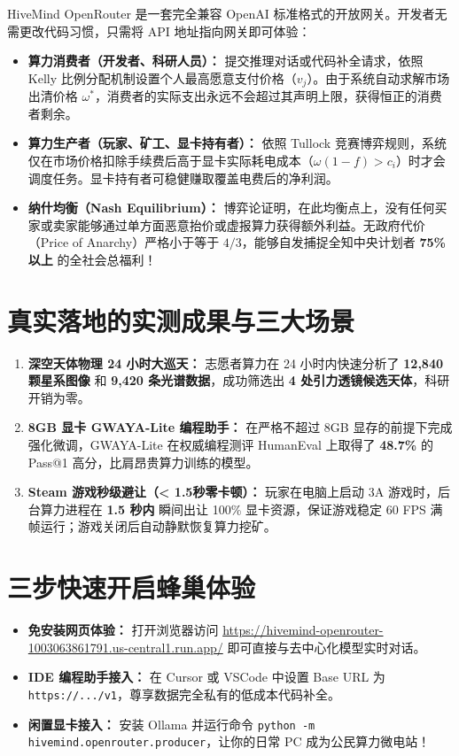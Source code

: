 \documentclass[11pt,a4paper]{report}
\begin{document}
HiveMind OpenRouter 是一套完全兼容 OpenAI 标准格式的开放网关。开发者无需更改代码习惯，只需将 API 地址指向网关即可体验：

\begin{itemize}[leftmargin=1.8em]
    \item \textbf{算力消费者（开发者、科研人员）：} 提交推理对话或代码补全请求，依照 Kelly 比例分配机制设置个人最高愿意支付价格（$v_j$）。由于系统自动求解市场出清价格 $\omega^*$，消费者的实际支出永远不会超过其声明上限，获得恒正的消费者剩余。
    \item \textbf{算力生产者（玩家、矿工、显卡持有者）：} 依照 Tullock 竞赛博弈规则，系统仅在市场价格扣除手续费后高于显卡实际耗电成本（$\omega(1-f) > c_i$）时才会调度任务。显卡持有者可稳健赚取覆盖电费后的净利润。
    \item \textbf{纳什均衡（Nash Equilibrium）：} 博弈论证明，在此均衡点上，没有任何买家或卖家能够通过单方面恶意抬价或虚报算力获得额外利益。无政府代价（Price of Anarchy）严格小于等于 $4/3$，能够自发捕捉全知中央计划者 \textbf{75\% 以上} 的全社会总福利！
\end{itemize}

\section{真实落地的实测成果与三大场景}
\begin{enumerate}[leftmargin=1.8em]
    \item \textbf{深空天体物理 24 小时大巡天：} 志愿者算力在 24 小时内快速分析了 \textbf{12,840 颗星系图像} 和 \textbf{9,420 条光谱数据}，成功筛选出 \textbf{4 处引力透镜候选天体}，科研开销为零。
    \item \textbf{8GB 显卡 GWAYA-Lite 编程助手：} 在严格不超过 8GB 显存的前提下完成强化微调，GWAYA-Lite 在权威编程测评 HumanEval 上取得了 \textbf{48.7\%} 的 Pass@1 高分，比肩昂贵算力训练的模型。
    \item \textbf{Steam 游戏秒级避让（< 1.5秒零卡顿）：} 玩家在电脑上启动 3A 游戏时，后台算力进程在 \textbf{1.5 秒内} 瞬间出让 100\% 显卡资源，保证游戏稳定 60 FPS 满帧运行；游戏关闭后自动静默恢复算力挖矿。
\end{enumerate}

\section{三步快速开启蜂巢体验}
\begin{itemize}[leftmargin=1.8em]
    \item \textbf{免安装网页体验：} 打开浏览器访问 \url{https://hivemind-openrouter-1003063861791.us-central1.run.app/} 即可直接与去中心化模型实时对话。
    \item \textbf{IDE 编程助手接入：} 在 Cursor 或 VSCode 中设置 Base URL 为 \texttt{https://.../v1}，尊享数据完全私有的低成本代码补全。
    \item \textbf{闲置显卡接入：} 安装 Ollama 并运行命令 \texttt{python -m hivemind.openrouter.producer}，让你的日常 PC 成为公民算力微电站！
\end{itemize}
\end{document}
